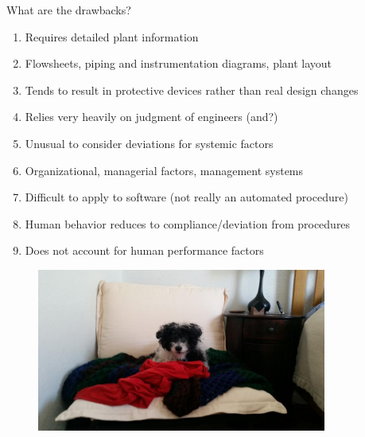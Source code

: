 \documentclass[aspectratio=1610,pdftex,dvipsnames,compress,xcolor={dvipsnames}]{beamer}
\begin{document}
\addtocounter{framenumber}{-1}
\begin{frame}{What are the drawbacks?}
    \begin{enumerate}[series=outerlist,topsep=0pt,itemsep=11pt,leftmargin=*,label=(\arabic*)]
        \item[]Requires detailed plant information  
        \item[]Flowsheets, piping and instrumentation diagrams, plant layout
        \item[]Tends to result in protective devices rather than real design changes
        \item[]Relies very heavily on judgment of engineers (and?)
        \item[]Unusual to consider deviations for systemic factors  
        \item[]Organizational, managerial factors, management systems
        \item[]Difficult to apply to software (not really an automated procedure)
        \item[]Human behavior reduces to compliance/deviation from procedures  
        \item[]Does not account for human performance factors
    \end{enumerate}
\end{frame}


\begin{frame}[plain]{}
    \begin{figure}
        \centering
        \includegraphics[width=0.85\textwidth]{final.jpg}
    \end{figure}
\end{frame}
\end{document}

